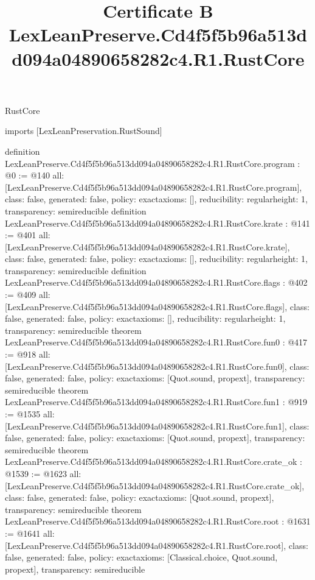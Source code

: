 \begin{lexlean}{RustCore}
\title{Certificate B LexLeanPreserve.Cd4f5f5b96a513dd094a04890658282c4.R1.RustCore}
\begin{coremodule}
imports [LexLeanPreservation.RustSound]

definition LexLeanPreserve.Cd4f5f5b96a513dd094a04890658282c4.R1.RustCore.program : @0 := @140 {
  all: [LexLeanPreserve.Cd4f5f5b96a513dd094a04890658282c4.R1.RustCore.program],
  class: false,
  generated: false,
  policy: exact{axioms: []},
  reducibility: regular{height: 1},
  transparency: semireducible
}
definition LexLeanPreserve.Cd4f5f5b96a513dd094a04890658282c4.R1.RustCore.krate : @141 := @401 {
  all: [LexLeanPreserve.Cd4f5f5b96a513dd094a04890658282c4.R1.RustCore.krate],
  class: false,
  generated: false,
  policy: exact{axioms: []},
  reducibility: regular{height: 1},
  transparency: semireducible
}
definition LexLeanPreserve.Cd4f5f5b96a513dd094a04890658282c4.R1.RustCore.flags : @402 := @409 {
  all: [LexLeanPreserve.Cd4f5f5b96a513dd094a04890658282c4.R1.RustCore.flags],
  class: false,
  generated: false,
  policy: exact{axioms: []},
  reducibility: regular{height: 1},
  transparency: semireducible
}
theorem LexLeanPreserve.Cd4f5f5b96a513dd094a04890658282c4.R1.RustCore.fun0 : @417 := @918 {
  all: [LexLeanPreserve.Cd4f5f5b96a513dd094a04890658282c4.R1.RustCore.fun0],
  class: false,
  generated: false,
  policy: exact{axioms: [Quot.sound, propext]},
  transparency: semireducible
}
theorem LexLeanPreserve.Cd4f5f5b96a513dd094a04890658282c4.R1.RustCore.fun1 : @919 := @1535 {
  all: [LexLeanPreserve.Cd4f5f5b96a513dd094a04890658282c4.R1.RustCore.fun1],
  class: false,
  generated: false,
  policy: exact{axioms: [Quot.sound, propext]},
  transparency: semireducible
}
theorem LexLeanPreserve.Cd4f5f5b96a513dd094a04890658282c4.R1.RustCore.crate_ok : @1539 := @1623 {
  all: [LexLeanPreserve.Cd4f5f5b96a513dd094a04890658282c4.R1.RustCore.crate_ok],
  class: false,
  generated: false,
  policy: exact{axioms: [Quot.sound, propext]},
  transparency: semireducible
}
theorem LexLeanPreserve.Cd4f5f5b96a513dd094a04890658282c4.R1.RustCore.root : @1631 := @1641 {
  all: [LexLeanPreserve.Cd4f5f5b96a513dd094a04890658282c4.R1.RustCore.root],
  class: false,
  generated: false,
  policy: exact{axioms: [Classical.choice, Quot.sound, propext]},
  transparency: semireducible
}


\end{coremodule}
\end{lexlean}
